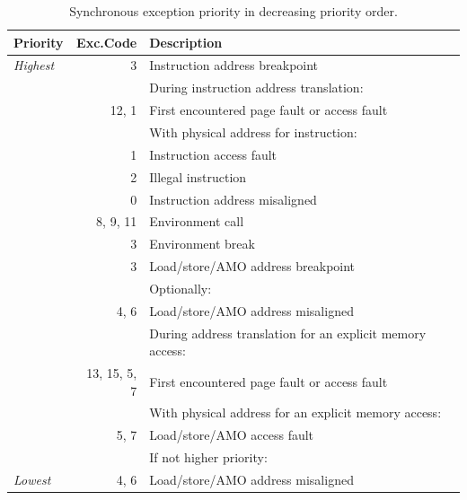 \begin{table}[htbp]
\begin{center}
\begin{tabular}{|l|r|l|}

  \hline
  Priority      & Exc.\@ Code & Description \\
  \hline
  {\em Highest} &          3 & Instruction address breakpoint \\
  \hline
                &            & During instruction address translation: \\
                &      12, 1 & \quad First encountered page fault or
                                 access fault \\
  \hline
                &            & With physical address for instruction: \\
                &          1 & \quad Instruction access fault \\
  \hline
                &          2 & Illegal instruction \\
                &          0 & Instruction address misaligned \\
                &   8, 9, 11 & Environment call \\
                &          3 & Environment break \\
                &          3 & Load/store/AMO address breakpoint \\
  \hline
                &            & Optionally: \\
                &       4, 6 & \quad Load/store/AMO address misaligned \\
  \hline
                &            & During address translation for an explicit
                                 memory access: \\
              & 13, 15, 5, 7 & \quad First encountered page fault or
                                 access fault \\
  \hline
                &            & With physical address for an explicit
                                 memory access: \\
                &       5, 7 & \quad Load/store/AMO access fault \\
  \hline
                &            & If not higher priority: \\
  {\em Lowest}  &       4, 6 & \quad Load/store/AMO address misaligned \\
  \hline

\end{tabular}
\end{center}
\caption{Synchronous exception priority in decreasing priority order.}
\label{exception-priority}
\end{table}

